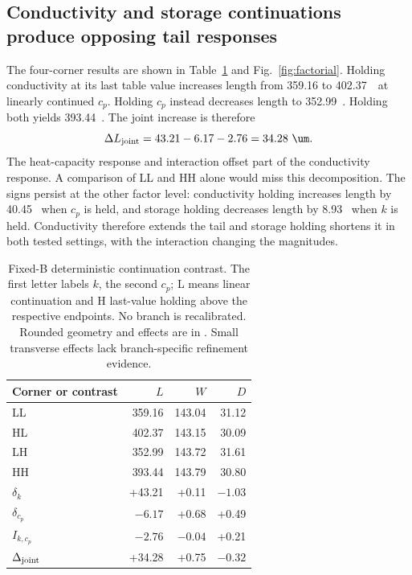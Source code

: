 \subsection{Conductivity and storage continuations produce opposing tail responses}
The four-corner results are shown in Table~\ref{tab:factorial} and Fig.~\ref{fig:factorial}. Holding conductivity at its last table value increases length from 359.16 to 402.37~\um\ at linearly continued $c_p$. Holding $c_p$ instead decreases length to 352.99~\um. Holding both yields 393.44~\um. The joint increase is therefore
\begin{equation}
 \Delta L_{\rm joint}=43.21-6.17-2.76=34.28~\um.
\end{equation}
The heat-capacity response and interaction offset part of the conductivity response. A comparison of LL and HH alone would miss this decomposition. The signs persist at the other factor level: conductivity holding increases length by 40.45~\um{} when $c_p$ is held, and storage holding decreases length by 8.93~\um{} when $k$ is held. Conductivity therefore extends the tail and storage holding shortens it in both tested settings, with the interaction changing the magnitudes.

\begin{table}[htbp]
\centering
\caption{Fixed-B deterministic continuation contrast. The first letter labels $k$, the second $c_p$; L means linear continuation and H last-value holding above the respective endpoints. No branch is recalibrated. Rounded geometry and effects are in \um. Small transverse effects lack branch-specific refinement evidence.}
\label{tab:factorial}
\begin{tabular}{lrrr}
\toprule
Corner or contrast & $L$ & $W$ & $D$\\
\midrule
LL & 359.16 & 143.04 & 31.12\\
HL & 402.37 & 143.15 & 30.09\\
LH & 352.99 & 143.72 & 31.61\\
HH & 393.44 & 143.79 & 30.80\\
\midrule
$\delta_k$ & +43.21 & +0.11 & $-1.03$\\
$\delta_{c_p}$ & $-6.17$ & +0.68 & +0.49\\
$I_{k,c_p}$ & $-2.76$ & $-0.04$ & +0.21\\
$\Delta_{\rm joint}$ & +34.28 & +0.75 & $-0.32$\\
\bottomrule
\end{tabular}
\end{table}

